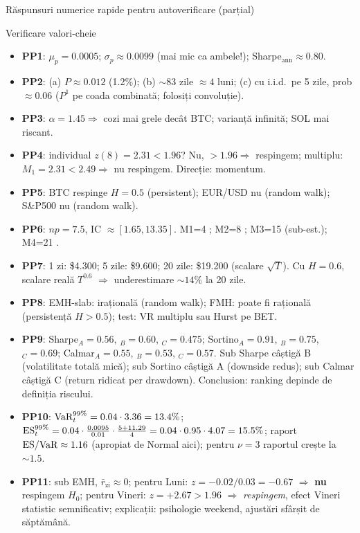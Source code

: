 \documentclass[9pt, aspectratio=169, t]{beamer}
\begin{document}
\begin{frame}[shrink=22]{Răspunsuri numerice rapide pentru autoverificare (parțial)}
\begin{cminipage}{0.95\textwidth}
\begin{exampleblock}{Verificare valori-cheie}
\small
\begin{itemize}\setlength{\itemsep}{1pt}
    \item \textbf{PP1}: $\mu_p=0.0005$; $\sigma_p\approx 0.0099$ (mai mic ca ambele!); Sharpe$_{\text{ann}}\approx 0.80$.
    \item \textbf{PP2}: (a) $P\approx 0.012$ (1.2\%); (b) $\sim 83$ zile $\approx 4$ luni; (c) cu i.i.d.\ pe 5 zile, prob $\approx 0.06$ ($P^{1}$ pe coada combinată; folosiți convoluție).
    \item \textbf{PP3}: $\alpha=1.45 \Rightarrow$ cozi mai grele decât BTC; varianță infinită; SOL mai riscant.
    \item \textbf{PP4}: individual $z(8)=2.31 < 1.96$? Nu, $>1.96 \Rightarrow$ respingem; multiplu: $M_1=2.31 < 2.49 \Rightarrow$ nu respingem. Direcție: momentum.
    \item \textbf{PP5}: BTC respinge $H=0.5$ (persistent); EUR/USD nu (random walk); S\&P500 nu (random walk).
    \item \textbf{PP6}: $np=7.5$, IC $\approx [1.65, 13.35]$. M1=4 \correct; M2=8 \correct; M3=15 \incorrect (sub-est.); M4=21 \incorrect.
    \item \textbf{PP7}: 1 zi: \$4.300; 5 zile: \$9.600; 20 zile: \$19.200 (scalare $\sqrt T$). Cu $H=0.6$, scalare reală $T^{0.6}$ $\Rightarrow$ underestimare $\sim 14\%$ la 20 zile.
    \item \textbf{PP8}: EMH-slab: irațională (random walk); FMH: poate fi rațională (persistență $H>0.5$); test: VR multiplu sau Hurst pe BET.
    \item \textbf{PP9}: Sharpe$_A=0.56$, $_B=0.60$, $_C=0.475$; Sortino$_A=0.91$, $_B=0.75$, $_C=0.69$; Calmar$_A=0.55$, $_B=0.53$, $_C=0.57$. Sub Sharpe câștigă B (volatilitate totală mică); sub Sortino câștigă A (downside redus); sub Calmar câștigă C (return ridicat per drawdown). Conclusion: ranking depinde de definiția riscului.
    \item \textbf{PP10}: $\text{VaR}^{99\%}_t = 0.04\cdot 3.36 = 13.4\%$; $\text{ES}^{99\%}_t = 0.04\cdot \frac{0.0095}{0.01}\cdot\frac{5+11.29}{4} = 0.04\cdot 0.95\cdot 4.07 = 15.5\%$; raport $\text{ES}/\text{VaR} \approx 1.16$ (apropiat de Normal aici); pentru $\nu=3$ raportul crește la $\sim 1.5$.
    \item \textbf{PP11}: sub EMH, $\bar r_{\text{zi}} \approx 0$; pentru Luni: $z = -0.02/0.03 = -0.67$ $\Rightarrow$ \textbf{nu} respingem $H_0$; pentru Vineri: $z = +2.67 > 1.96$ $\Rightarrow$ \emph{respingem}, efect Vineri statistic semnificativ; explicații: psihologie weekend, ajustări sfârșit de săptămână.
\end{itemize}
\end{exampleblock}
\end{cminipage}
\end{frame}
\end{document}
